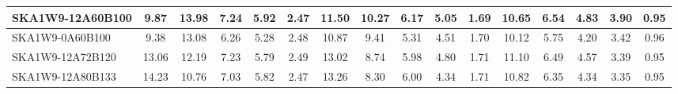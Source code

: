 \begin{table}[H]
{{\begin{tabular}{|lccccc||ccccc||ccccc|}
SKA1W9-12A60B100 & 9.87 \cellcolor{blue!31.39} & 13.98 \cellcolor{red!54.99} & 7.24 \cellcolor{green!52.30} & 5.92 \cellcolor{orange!56.40} & 2.47 \cellcolor{purple!20.80} & 11.50 \cellcolor{blue!43.24} & 10.27 \cellcolor{red!47.78} & 6.17 \cellcolor{green!60.00} & 5.05 \cellcolor{orange!57.24} & 1.69 \cellcolor{purple!18.00} & 10.65 \cellcolor{blue!55.22} & 6.54 \cellcolor{red!48.44} & 4.83 \cellcolor{green!57.49} & 3.90 \cellcolor{orange!48.00} & 0.95 \cellcolor{purple!18.00}\\ \hline 
SKA1W9-0A60B100 & 9.38 \cellcolor{blue!28.17} & 13.08 \cellcolor{red!48.55} & 6.26 \cellcolor{green!18.00} & 5.28 \cellcolor{orange!18.00} & 2.48 \cellcolor{purple!23.60} & 10.87 \cellcolor{blue!37.24} & 9.41 \cellcolor{red!37.37} & 5.31 \cellcolor{green!18.00} & 4.51 \cellcolor{orange!27.39} & 1.70 \cellcolor{purple!22.20} & 10.12 \cellcolor{blue!49.58} & 5.75 \cellcolor{red!18.00} & 4.20 \cellcolor{green!18.00} & 3.42 \cellcolor{orange!21.82} & 0.96 \cellcolor{purple!26.40}\\ \hline 
SKA1W9-12A72B120 & 13.06 \cellcolor{blue!52.32} & 12.19 \cellcolor{red!42.18} & 7.23 \cellcolor{green!51.95} & 5.79 \cellcolor{orange!48.60} & 2.49 \cellcolor{purple!26.40} & 13.02 \cellcolor{blue!57.71} & 8.74 \cellcolor{red!29.26} & 5.98 \cellcolor{green!50.72} & 4.80 \cellcolor{orange!43.42} & 1.71 \cellcolor{purple!26.40} & 11.10 \cellcolor{blue!60.00} & 6.49 \cellcolor{red!46.51} & 4.57 \cellcolor{green!41.19} & 3.39 \cellcolor{orange!20.18} & 0.95 \cellcolor{purple!18.00}\\ \hline 
SKA1W9-12A80B133 & 14.23 \cellcolor{blue!60.00} & 10.76 \cellcolor{red!31.95} & 7.03 \cellcolor{green!44.95} & 5.82 \cellcolor{orange!50.40} & 2.47 \cellcolor{purple!20.80} & 13.26 \cellcolor{blue!60.00} & 8.30 \cellcolor{red!23.93} & 6.00 \cellcolor{green!51.70} & 4.34 \cellcolor{orange!18.00} & 1.71 \cellcolor{purple!26.40} & 10.82 \cellcolor{blue!57.02} & 6.35 \cellcolor{red!41.12} & 4.34 \cellcolor{green!26.78} & 3.35 \cellcolor{orange!18.00} & 0.95 \cellcolor{purple!18.00}\\ \hline 
\end{tabular}}
\vspace{-0.300000cm}
\hspace{1cm} 
}
\end{table}
